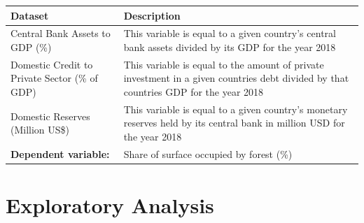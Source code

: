 \documentclass[
  12pt,
]{article}
\begin{document}
\begin{longtable}[]{@{}ll@{}}
\toprule
\begin{minipage}[b]{0.54\columnwidth}\raggedright
Dataset\strut
\end{minipage} & \begin{minipage}[b]{0.40\columnwidth}\raggedright
Description\strut
\end{minipage}\tabularnewline
\midrule
\endhead
\begin{minipage}[t]{0.54\columnwidth}\raggedright
Central Bank Assets to GDP (\%)\strut
\end{minipage} & \begin{minipage}[t]{0.40\columnwidth}\raggedright
This variable is equal to a given country's central bank assets divided
by its GDP for the year 2018\strut
\end{minipage}\tabularnewline
\begin{minipage}[t]{0.54\columnwidth}\raggedright
Domestic Credit to Private Sector (\% of GDP)\strut
\end{minipage} & \begin{minipage}[t]{0.40\columnwidth}\raggedright
This variable is equal to the amount of private investment in a given
countries debt divided by that countries GDP for the year 2018\strut
\end{minipage}\tabularnewline
\begin{minipage}[t]{0.54\columnwidth}\raggedright
Domestic Reserves (Million US\$)\strut
\end{minipage} & \begin{minipage}[t]{0.40\columnwidth}\raggedright
This variable is equal to a given country's monetary reserves held by
its central bank in million USD for the year 2018\strut
\end{minipage}\tabularnewline
\begin{minipage}[t]{0.54\columnwidth}\raggedright
\textbf{Dependent variable:}\strut
\end{minipage} & \begin{minipage}[t]{0.40\columnwidth}\raggedright
Share of surface occupied by forest (\%)\strut
\end{minipage}\tabularnewline
\bottomrule
\end{longtable}

\newpage

\hypertarget{exploratory-analysis}{%
\section{Exploratory Analysis}\label{exploratory-analysis}}
\end{document}
